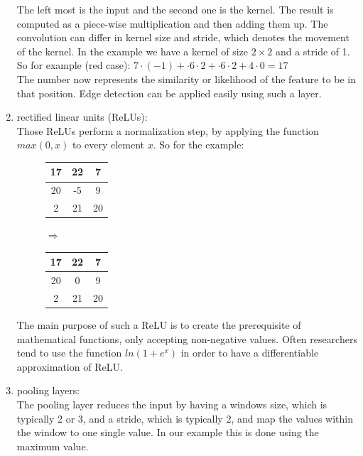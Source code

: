 \begin{enumerate}
\begin{figure}[H]
	\end{figure}
	The left most is the input and the second one is the kernel. The result is computed as a piece-wise multiplication and then adding them up. The convolution can differ in kernel size and stride, which denotes the movement of the kernel. In the example we have a kernel of size $2\times2$ and a stride of 1.\\
	So for example (red case): $7\cdot(-1)+\cdot6\cdot2+\cdot6\cdot2+4\cdot0=17$\\
	The number now represents the similarity or likelihood of the feature to be in that position. Edge detection can be applied easily using such a layer. \cite{hubel1968receptive}
\item rectified linear units (ReLUs):\\
	Those ReLUs perform a normalization step, by applying the function $max(0,x)$ to every element $x$. So for the example:
	\begin{figure}[H]
		\centering
		\begin{tabular}{|c|c|c|} \hline
			17 & 22 & 7\\\hline
			20 & -5 & 9\\\hline
			2 & 21 & 20\\\hline
		\end{tabular}
		$\Rightarrow$
		\begin{tabular}{|c|c|c|} \hline
			17 & 22 & 7\\\hline
			20 & 0 & 9\\\hline
			2 & 21 & 20\\\hline
		\end{tabular}
	\end{figure}
	The main purpose of such a ReLU is to create the prerequisite of mathematical functions, only accepting non-negative values. Often researchers tend to use the function $ln(1+e^x)$ in order to have a differentiable approximation of ReLU. 
\item pooling layers:\\
	The pooling layer reduces the input by having a windows size, which is typically 2 or 3, and a stride, which is typically 2, and map the values within the window to one single value. In our example this is done using the maximum value.

\end{enumerate}
